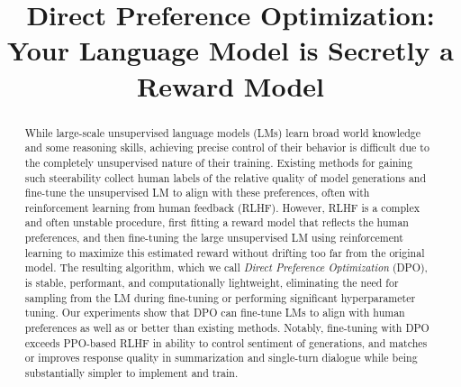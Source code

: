\title{Direct Preference Optimization:\\ Your Language Model is Secretly a Reward Model}



\maketitle

\begin{abstract}
While large-scale unsupervised language models (LMs) learn broad world knowledge and some reasoning skills, achieving precise control of their behavior is difficult due to the completely unsupervised nature of their training.
Existing methods for gaining such steerability collect human labels of the relative quality of model generations and fine-tune the unsupervised LM to align with these preferences, often with reinforcement learning from human feedback (RLHF).
However, RLHF is a complex and often unstable procedure, first fitting a reward model that reflects the human preferences, and then fine-tuning the large unsupervised LM using reinforcement learning to maximize this estimated reward without drifting too far from the original model.
The resulting algorithm, which we call \textit{Direct Preference Optimization} (DPO), is stable, performant, and computationally lightweight, eliminating the need for  sampling from the LM during fine-tuning or performing significant hyperparameter tuning.
Our experiments show that DPO can fine-tune LMs to align with human preferences as well as or better than existing methods. Notably, fine-tuning with DPO exceeds PPO-based RLHF in ability to control sentiment of generations, and matches or improves response quality in summarization and single-turn dialogue while being substantially simpler to implement and train.

\end{abstract}

